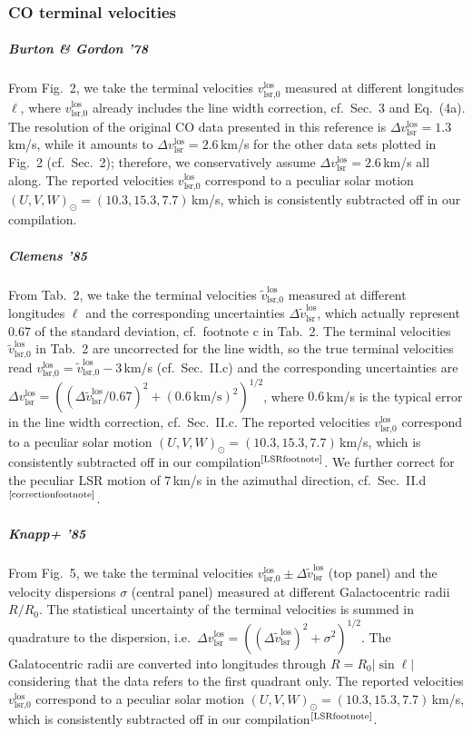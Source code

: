 \documentclass[twocolumn,prd,reprint,preprintnumbers,amsmath,amssymb,superscriptaddress,nofootinbib]{revtex4}
\begin{document}
\subsubsection{CO terminal velocities}

\subparagraph{Burton \& Gordon '78 \cite{BurtonGordon1978}} From Fig.~2, we take the terminal velocities $v_{\textrm{lsr,0}}^{\textrm{los}}$ measured at different longitudes $\ell$, where $v_{\textrm{lsr,0}}^{\textrm{los}}$ already includes the line width correction, cf.~Sec.~3 and Eq.~(4a). The resolution of the original CO data presented in this reference is $\Delta v_{\textrm{lsr}}^{\textrm{los}}=1.3\,$km/s, while it amounts to $\Delta v_{\textrm{lsr}}^{\textrm{los}}=2.6\,$km/s for the other data sets \cite{Bania1977,Liszt1977} plotted in Fig.~2 (cf.~Sec.~2); therefore, we conservatively assume $\Delta v_{\textrm{lsr}}^{\textrm{los}}=2.6\,$km/s all along. The reported velocities $v_{\textrm{lsr,0}}^{\textrm{los}}$ correspond to a peculiar solar motion $(U,V,W)_{\odot}=(10.3,15.3,7.7)\,$km/s, which is consistently subtracted off in our compilation.

\subparagraph{Clemens '85 \cite{Clemens1985}} From Tab.~2, we take the terminal velocities $\tilde{v}_{\textrm{lsr,0}}^{\textrm{los}}$ measured at different longitudes $\ell$ and the corresponding uncertainties $\Delta \tilde{v}_{\textrm{lsr}}^{\textrm{los}}$, which actually represent 0.67 of the standard deviation, cf.~footnote c in Tab.~2. The terminal velocities $\tilde{v}_{\textrm{lsr,0}}^{\textrm{los}}$ in Tab.~2 are uncorrected for the line width, so the true terminal velocities read $v_{\textrm{lsr,0}}^{\textrm{los}}=\tilde{v}_{\textrm{lsr,0}}^{\textrm{los}}-3\,$km/s (cf.~Sec.~II.c) and the corresponding uncertainties are $\Delta v_{\textrm{lsr}}^{\textrm{los}}=\left( (\Delta \tilde{v}_{\textrm{lsr}}^{\textrm{los}}/0.67)^2 +(0.6\,\textrm{km/s})^2  \right)^{1/2}$, where $0.6\,$km/s is the typical error in the line width correction, cf.~Sec.~II.c. The reported velocities $v_{\textrm{lsr,0}}^{\textrm{los}}$ correspond to a peculiar solar motion $(U,V,W)_{\odot}=(10.3,15.3,7.7)\,$km/s, which is consistently subtracted off in our compilation$^\text{\ref{LSRfootnote}}$. We further correct for the peculiar LSR motion of $7\,$km/s in the azimuthal direction, cf.~Sec.~II.d$^\text{\ref{correctionfootnote}}$.

\subparagraph{Knapp+ '85 \cite{Knapp1985}} From Fig.~5, we take the terminal velocities $v_{\textrm{lsr,0}}^{\textrm{los}}\pm \Delta \tilde{v}_{\textrm{lsr}}^{\textrm{los}}$ (top panel) and the velocity dispersions $\sigma$ (central panel) measured at different Galactocentric radii $R/R_0$. The statistical uncertainty of the terminal velocities is summed in quadrature to the dispersion, i.e.~$\Delta v_{\textrm{lsr}}^{\textrm{los}}=\left( (\Delta \tilde{v}_{\textrm{lsr}}^{\textrm{los}})^2 + \sigma^2 \right)^{1/2}$. The Galatocentric radii are converted into longitudes through $R=R_0|\sin\ell|$ considering that the data refers to the first quadrant only. The reported velocities $v_{\textrm{lsr,0}}^{\textrm{los}}$ correspond to a peculiar solar motion $(U,V,W)_{\odot}=(10.3,15.3,7.7)\,$km/s, which is consistently subtracted off in our compilation$^\text{\ref{LSRfootnote}}$.
\end{document}
